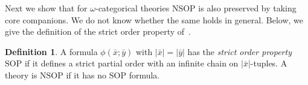 \documentclass{amsart}
\theoremstyle{definition}
\newtheorem{definition}[theorem]{Definition}
\theoremstyle{remark}
\numberwithin{equation}{section}
\newcommand\green[1]{\textcolor{green!50!black}{#1}}
\newcommand{\pau}[1]{\textcolor{blue}{#1}}
\begin{document}
	Next we show that for $\omega$-categorical theories $\mathrm{NSOP}$ is also preserved by taking core companions. We do not know whether the same holds in general. Below, we give the definition of the strict order property of~\cite{shelah1995toward}. %




\begin{definition}\label{def:nsop}
	A formula $\phi(\bar{x};\bar{y})$ with $|\bar{x}|=|\bar{y}|$ has the \emph{strict order property} $\mathrm{SOP}$ if it defines a strict partial order with an infinite chain
    on $|\bar{x}|$-tuples. %
  A theory is $\mathrm{NSOP}$ if it has no $\mathrm{SOP}$ formula.
\end{definition}
\end{document}
